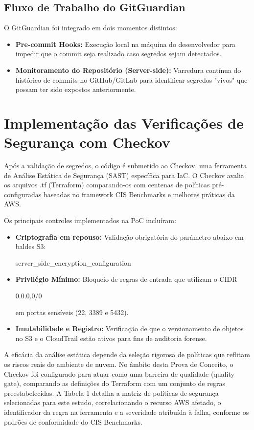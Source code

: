 \subsection{Fluxo de Trabalho do GitGuardian}
O GitGuardian foi integrado em dois momentos distintos:
\begin{itemize}
    \item\textbf{Pre-commit Hooks:} Execução local na máquina do desenvolvedor para impedir que o commit seja realizado caso segredos sejam detectados.
    \item\textbf{Monitoramento do Repositório (Server-side):} Varredura contínua do histórico de commits no GitHub/GitLab para identificar segredos "vivos" que possam ter sido expostos anteriormente.
\end{itemize}



\section{Implementação das Verificações de Segurança com Checkov}
Após a validação de segredos, o código é submetido ao Checkov, uma ferramenta de Análise Estática de Segurança (SAST) específica para IaC. O Checkov avalia os arquivos .tf (Terraform) comparando-os com centenas de políticas pré-configuradas baseadas no framework CIS Benchmarks e melhores práticas da AWS.

Os principais controles implementados na PoC incluíram:

\begin{itemize}
    \item\textbf{Criptografia em repouso:} Validação obrigatória do parâmetro abaixo em baldes S3:
    \begin{foo}server_side_encryption_configuration\end{foo} 
    \item\textbf{Privilégio Mínimo:} Bloqueio de regras de entrada que utilizam o CIDR \begin{foo}0.0.0.0/0\end{foo} 
    em portas sensíveis (22, 3389 e 5432).
    \item\textbf{Imutabilidade e Registro:} Verificação de que o versionamento de objetos no S3 e o CloudTrail estão ativos para fins de auditoria forense.
\end{itemize}

A eficácia da análise estática depende da seleção rigorosa de políticas que reflitam os riscos reais do ambiente de nuvem. No âmbito desta Prova de Conceito, o Checkov foi configurado para atuar como uma barreira de qualidade (quality gate), comparando as definições do Terraform com um conjunto de regras preestabelecidas. A Tabela 1 detalha a matriz de políticas de segurança selecionadas para este estudo, correlacionando o recurso AWS afetado, o identificador da regra na ferramenta e a severidade atribuída à falha, conforme os padrões de conformidade do CIS Benchmarks.


